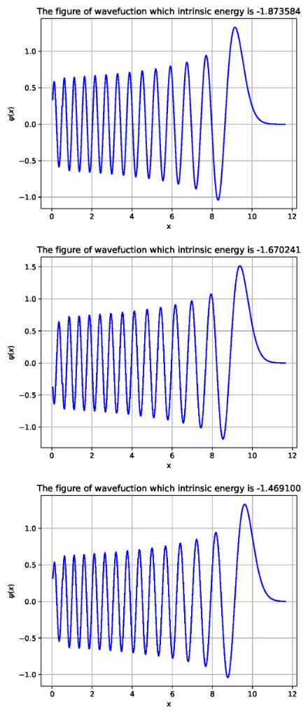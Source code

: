 \documentclass[twoside,twocolumn]{article}
\begin{document}
\begin{CJK*}{UTF8}{gkai}
\begin{figure}
	\label{fig:25}
\end{figure}
\begin{figure}
	\centering
	\includegraphics[width=0.9\linewidth]{figure/26}
	\label{fig:26}
\end{figure}
\begin{figure}
	\centering
	\includegraphics[width=0.9\linewidth]{figure/27}
	\label{fig:27}
\end{figure}
\begin{figure}
	\centering
	\includegraphics[width=0.9\linewidth]{figure/28}

\end{figure}
\end{CJK*}
\end{document}
